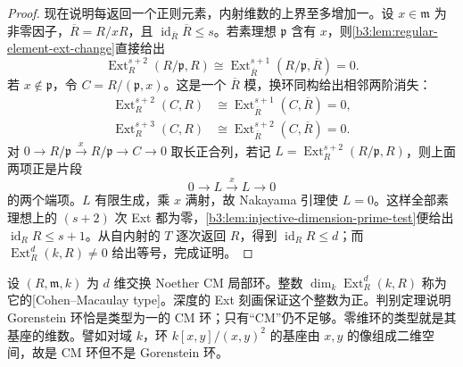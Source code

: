 \begin{proof}
	现在说明每返回一个正则元素，内射维数的上界至多增加一。设 \(x\in\mathfrak m\) 为非零因子，\(\overline R=R/xR\)，且 \(\operatorname{id}_{\overline R}\overline R\le s\)。若素理想 \(\mathfrak p\) 含有 \(x\)，则\cref{b3:lem:regular-element-ext-change}直接给出
	\[
		\operatorname{Ext}_R^{s+2}(R/\mathfrak p,R) \cong\operatorname{Ext}_{\overline R}^{s+1}(R/\mathfrak p,\overline R)=0.
	\]
	若 \(x\notin\mathfrak p\)，令 \(C=R/(\mathfrak p,x)\)。这是一个 \(\overline R\) 模，换环同构给出相邻两阶消失：
	\[
		\begin{aligned}
			\operatorname{Ext}_R^{s+2}(C,R) &\cong\operatorname{Ext}_{\overline R}^{s+1}(C,\overline R)=0,\\
			\operatorname{Ext}_R^{s+3}(C,R) &\cong\operatorname{Ext}_{\overline R}^{s+2}(C,\overline R)=0.
		\end{aligned}
	\]
	对 \(0\rightarrow R/\mathfrak p\xrightarrow{x}R/\mathfrak p\rightarrow C\rightarrow0\) 取长正合列，若记 \(L=\operatorname{Ext}_R^{s+2}(R/\mathfrak p,R)\)，则上面两项正是片段
	\[
		0\longrightarrow L\xrightarrow{x}L\longrightarrow0
	\]
	的两个端项。\(L\) 有限生成，乘 \(x\) 满射，故 Nakayama 引理使 \(L=0\)。这样全部素理想上的 \((s+2)\) 次 Ext 都为零，\cref{b3:lem:injective-dimension-prime-test}便给出 \(\operatorname{id}_RR\le s+1\)。从自内射的 \(T\) 逐次返回 \(R\)，得到 \(\operatorname{id}_RR\le d\)；而 \(\operatorname{Ext}_R^d(k,R)\ne0\) 给出等号，完成证明。
\end{proof}

设 \((R,\mathfrak m,k)\) 为 \(d\) 维交换 Noether CM 局部环。整数 \(\dim_k\operatorname{Ext}_R^d(k,R)\) 称为它的[Cohen--Macaulay type]。深度的 Ext 刻画保证这个整数为正。判别定理说明 Gorenstein 环恰是类型为一的 CM 环；只有“CM”仍不足够。零维环的类型就是其基座的维数。譬如对域 \(k\)，环 \(k[x,y]/(x,y)^2\) 的基座由 \(x,y\) 的像组成二维空间，故是 CM 环但不是 Gorenstein 环。

